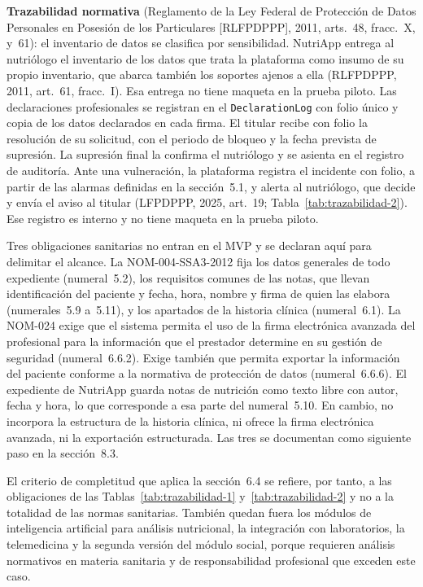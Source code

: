 \documentclass[12pt, a4paper]{article}
\begin{document}
\textbf{Trazabilidad normativa} (Reglamento de la Ley Federal de
Protección de Datos Personales en Posesión de los Particulares
[RLFPDPPP], 2011, arts.~48, fracc.~X, y~61): el inventario de datos se
clasifica por sensibilidad. NutriApp entrega al nutriólogo el inventario
de los datos que trata la plataforma como insumo de su propio
inventario, que abarca también los soportes ajenos a ella (RLFPDPPP,
2011, art.~61, fracc.~I). Esa entrega no tiene maqueta en la prueba
piloto. Las declaraciones profesionales se registran en el
\texttt{DeclarationLog} con folio único y copia de los datos declarados
en cada firma. El titular recibe con folio la resolución de su
solicitud, con el periodo de bloqueo y la fecha prevista de supresión.
La supresión final la confirma el nutriólogo y se asienta en el registro
de auditoría. Ante una vulneración, la plataforma registra el incidente
con folio, a partir de las alarmas definidas en la sección~5.1, y alerta
al nutriólogo, que decide y envía el aviso al titular (LFPDPPP, 2025,
art.~19; Tabla~\ref{tab:trazabilidad-2}). Ese registro es interno y no
tiene maqueta en la prueba piloto.
 
Tres obligaciones sanitarias no entran en el MVP y se declaran aquí para
delimitar el alcance. La NOM-004-SSA3-2012 fija los datos generales de
todo expediente (numeral~5.2), los requisitos comunes de las notas, que
llevan identificación del paciente y fecha, hora, nombre y firma de
quien las elabora (numerales~5.9 a~5.11), y los apartados de la historia
clínica (numeral~6.1). La NOM-024 exige que el sistema permita el uso de
la firma electrónica avanzada del profesional para la información que el
prestador determine en su gestión de seguridad (numeral~6.6.2). Exige
también que permita exportar la información del paciente conforme a la
normativa de protección de datos (numeral~6.6.6). El expediente de
NutriApp guarda notas de nutrición como texto libre con autor, fecha y
hora, lo que corresponde a esa parte del numeral~5.10. En cambio, no
incorpora la estructura de la historia clínica, ni ofrece la firma
electrónica avanzada, ni la exportación estructurada. Las tres se
documentan como siguiente paso en la sección~8.3.
 
El criterio de completitud que aplica la sección~6.4 se refiere, por
tanto, a las obligaciones de las Tablas~\ref{tab:trazabilidad-1}
y~\ref{tab:trazabilidad-2} y no a la totalidad de las normas
sanitarias. También quedan fuera los módulos de inteligencia
artificial para análisis nutricional, la integración con laboratorios,
la telemedicina y la segunda versión del módulo social, porque
requieren análisis normativos en materia sanitaria y de
responsabilidad profesional que exceden este caso.
 
\end{document}
